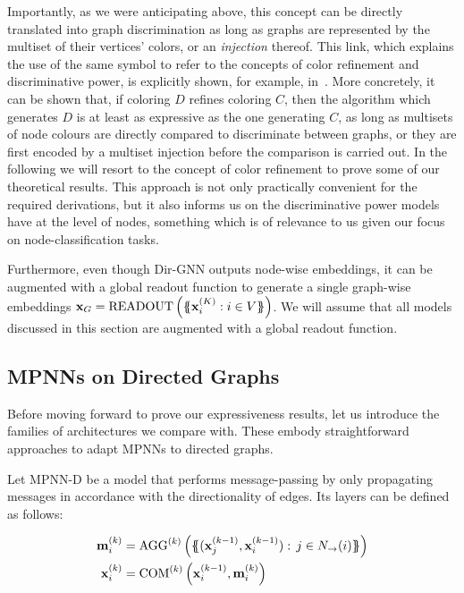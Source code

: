 \documentclass{article}
\newcommand{\out}{\rightarrow}
\newcommand\oursacro{Dir-GNN}
\newcommand\m{m}
\newcommand\ilayer{k}
\newcommand*{\ldblbrace}{\{\mskip-6mu\{}
\newcommand*{\rdblbrace}{\}\mskip-6mu\}}
\theoremstyle{plain}
\theoremstyle{definition}
\theoremstyle{remark}
\begin{document}
Importantly, as we were anticipating above, this concept can be directly translated into graph discrimination as long as graphs are represented by the multiset of their vertices' colors, or an \emph{injection} thereof. This link, which explains the use of the same symbol to refer to the concepts of color refinement and discriminative power, is explicitly shown, for example, in~\citet{pmlr-v139-bodnar21a,bevilacqua2022equivariant}. More concretely, it can be shown that, if coloring $D$ refines coloring $C$, then the algorithm which generates $D$ is at least as expressive as the one generating $C$, as long as multisets of node colours are directly compared to discriminate between graphs, or they are first encoded by a multiset injection before the comparison is carried out. In the following we will resort to the concept of color refinement to prove some of our theoretical results. This approach is not only practically convenient for the required derivations, but it also informs us on the discriminative power models have at the level of nodes, something which is of relevance to us given our focus on node-classification tasks.

Furthermore, even though \oursacro{} outputs node-wise embeddings, it can be augmented with a global readout function to generate a single graph-wise embeddings $\mathbf{x}_{G} = \mathrm{READOUT}\left(\ldblbrace \mathbf{x}_{i}^{(K)} : i \in V \rdblbrace\right)$. We will assume that all models discussed in this section are augmented with a global readout function.

\subsection{MPNNs on Directed Graphs}

Before moving forward to prove our expressiveness results, let us introduce the families of architectures we compare with. These embody straightforward approaches to adapt MPNNs to directed graphs.

Let MPNN-D be a model that performs message-passing by only propagating messages in accordance with the directionality of edges. Its layers can be defined as follows:

\begin{align}
\begin{split}
\mathbf{\m}^{(\ilayer)}_{i} &=  \mathrm{AGG}^{(\ilayer)}\left(\ldblbrace (\mathbf{x}_{j}^{(\ilayer-1)}, \mathbf{x}_{i}^{(\ilayer-1)}):\, j \in N_\out(i) \rdblbrace\right) \\
\mathbf{x}_{i}^{(\ilayer)}   &=  \mathrm{COM}^{(\ilayer)}\left(\mathbf{x}_i^{(\ilayer-1)}, \mathbf{\m}^{(\ilayer)}_i\right) \label{eq:mpnn-d}
\end{split}
\end{align}
\end{document}
